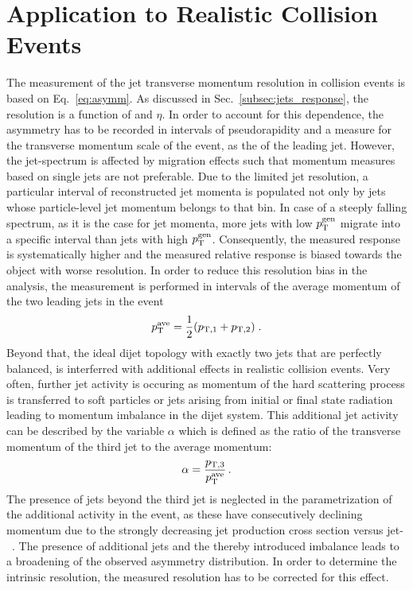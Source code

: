 \section{Application to Realistic Collision Events}
\label{sec:jer_application}
The measurement of the jet transverse momentum resolution in collision events is based on Eq.~\ref{eq:asymm}. As discussed in Sec.~\ref{subsec:jets_response}, the resolution is a function of \pt and $\eta$. In order to account for this dependence, the asymmetry has to be recorded in intervals of pseudorapidity and a measure for the transverse momentum scale of the event, as \eg the \pt of the leading jet. However, the jet-\pt spectrum is affected by migration effects such that momentum measures based on single jets are not preferable. Due to the limited jet resolution, a particular interval of reconstructed jet momenta is populated not only by jets whose particle-level jet momentum belongs to that bin. In case of a steeply falling spectrum, as it is the case for jet momenta, more jets with low $p_{\text{T}}^\mathrm{gen}$ migrate into a specific interval than jets with high $p_{\text{T}}^\mathrm{gen}$. Consequently, the measured response is systematically higher and the measured relative response is biased towards the object with worse resolution. In order to reduce this resolution bias in the analysis, the measurement is performed in intervals of the average momentum of the two leading jets in the event
\begin{equation}
p^{\text{ave}}_{\text{T}} = \frac{1}{2}(p_\mathrm{T,1} + p_\mathrm{T,2}) \; .
\end{equation}
Beyond that, the ideal dijet topology with exactly two jets that are perfectly balanced, is interferred with additional effects in realistic collision events. Very often, further jet activity is occuring as momentum of the hard scattering process is transferred to soft particles or jets arising from initial or final state radiation leading to momentum imbalance in the dijet system. This additional jet activity can be described by the variable $\alpha$ which is defined as the ratio of the transverse momentum of the third jet to the average momentum: 
 \begin{equation}
\label{eq:alpha}
\alpha = \frac{p_\mathrm{T,3}}{p_{\text{T}}^\mathrm{ave}} \, .
\end{equation}
The presence of jets beyond the third jet is neglected in the parametrization of the additional activity in the event, as these have consecutively declining momentum due to the strongly decreasing jet production cross section versus jet-\pt~\cite{CMS-PAS-QCD-11-004}. The presence of additional jets and the thereby introduced imbalance leads to a broadening of the observed asymmetry distribution. In order to determine the intrinsic resolution, the measured resolution has to be corrected for this effect. \\
